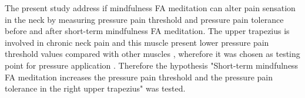 The present study address if mindfulness FA meditation can alter pain sensation in the neck by measuring pressure pain threshold and pressure pain tolerance before and after short-term mindfulness FA meditation. The upper trapezius is involved in chronic neck pain and this muscle present lower pressure pain threshold values compared with other muscles \cite{Fischer1987}, wherefore it was chosen as testing point for pressure application \cite{Falla2004}.
Therefore the hypothesis "Short-term mindfulness FA meditation increases the pressure pain threshold and the pressure pain tolerance in the right upper trapezius" was tested.

